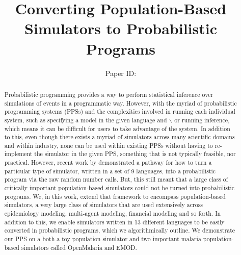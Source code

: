 \documentclass{article}
\title{Converting Population-Based Simulators to Probabilistic Programs}
\author{%
Paper ID: }
\begin{document}

\maketitle

\begin{abstract}


Probabilistic programming provides a way to perform statistical inference over simulations of events in a programmatic way.
However, with the myriad of probabilistic programming systems (PPSs) and the complexities involved in running 
each individual system, such as specifying a model in the given language and $\backslash$ or running inference, which means it can be difficult for users to take advantage of the system. 
In addition to this, even though there exists a myriad of simulators across many scientific domains 
and within industry, none can be used within existing PPSs without having to re-implement the simulator in the given PPS, something that is not typically feasible, nor practical.  
However, recent work
by \cite{baydin2018efficient} demonstrated a pathway for how to turn a particular
type of simulator, written in a set of 9 languages, into a probabilistic program via the raw random
number calls.
 But, this still meant that a large class of critically important population-based simulators could not be turned into probabilistic programs.
We, in this work, extend that framework to encompass population-based simulators, a very large class of simulators that are used extensively across epidemiology modeling, multi-agent modeling, financial modeling and so forth. In addition to this, we enable simulators written in 13 different languages to be easily converted in probabilistic programs, which we algorithmically outline. We demonstrate our PPS on a both a toy population simulator and two important malaria population-based simulators called OpenMalaria and EMOD. 


\end{abstract}
\end{document}

